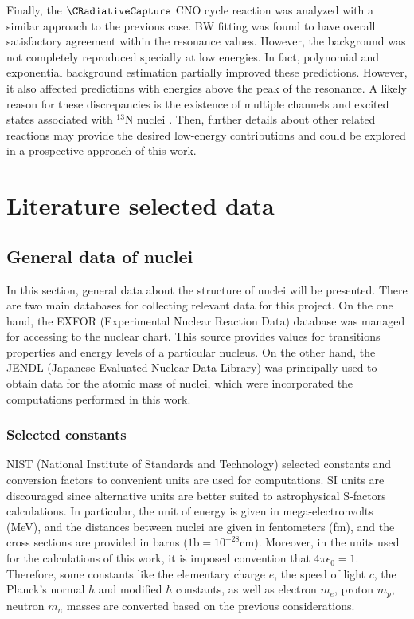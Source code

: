 \documentclass[openany]{book}
\begin{document}
Finally, the $\CRadiativeCapture$ CNO cycle reaction was analyzed with a similar approach to the previous case. BW fitting was found to have overall satisfactory agreement within the resonance values. However, the background was not completely reproduced specially at low energies. In fact, polynomial and exponential background estimation partially improved these predictions. However, it also affected predictions with energies above the peak of the resonance. A likely reason for these discrepancies is the existence of multiple channels and excited states associated with $\mathrm{{}^{13}N}$ nuclei \cite{xu_takahashi_goriely_arnould_ohta_utsunomiya_2013}. Then, further details about other related reactions may provide the desired low-energy contributions and could be explored in a prospective approach of this work. 


\appendix

\chapter{Literature selected data} \label{ap:literatureData}

\section{General data of nuclei} \label{sec:nucleiData}

In this section, general data about the structure of nuclei will be presented. There are two main databases for collecting relevant data for this project. On the one hand, the EXFOR (Experimental Nuclear Reaction Data) database \cite{zerkin_pritychenko_totans_vrapcenjak_rodionov_shulyak_2022} was managed for accessing to the nuclear chart. This source provides values for transitions properties and energy levels of a particular nucleus. On the other hand, the JENDL (Japanese Evaluated Nuclear Data Library) \cite{iwamoto_iwamoto_shibata_ichihara_kunieda_minato_nakayama_2020} was principally used to obtain data for the atomic mass of nuclei, which were incorporated the computations performed in this work. 

\subsection{Selected constants} \label{sub:selectedConstants}

NIST (National Institute of Standards and Technology) selected constants and conversion factors to convenient units are used for computations. SI units are discouraged since alternative units are better suited to astrophysical S-factors calculations. In particular, the unit of energy is given in mega-electronvolts (MeV), and the distances between nuclei are given in fentometers (fm), and the cross sections are provided in barns ($\mathrm{1b = 10^{-28}cm}$). Moreover, in the units used for  the calculations of this work, it is imposed convention that $4\pi\epsilon_0 = 1$. Therefore, some constants like the elementary charge $e$, the speed of light $c$, the Planck's normal $h$ and modified $\hbar$ constants, as well as electron $m_e$, proton $m_p$, neutron $m_n$ masses are converted based on the previous considerations. \\
\end{document}
